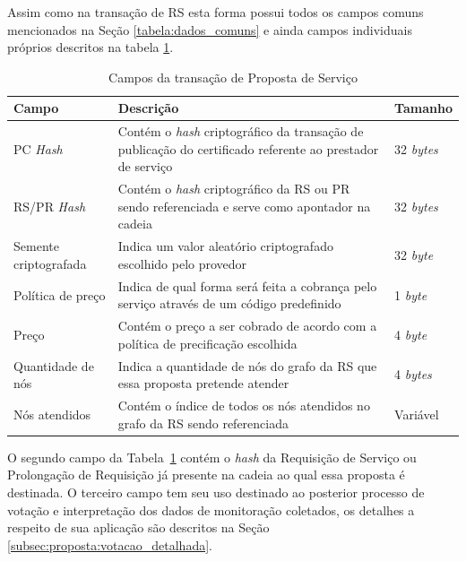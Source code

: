 Assim como na transação de \ac{RS} esta forma possui todos os campos comuns mencionados na Seção \ref{tabela:dados_comuns} e ainda campos individuais próprios descritos na tabela \ref{tabela:ps}.

\begin{table}[ht]
\centering
    \begin{tabular}{|m{}|m{}|m{}|}
    \hline
         \textbf{Campo} & \textbf{Descrição} & \textbf{Tamanho}  \\
         \hline
         \acs{PC} \textit{Hash} & Contém o \textit{hash} criptográfico da transação de publicação do certificado referente ao prestador de serviço & 32 \textit{bytes} \\
         \hline
         \ac{RS}/\acs{PR} \textit{Hash} & Contém o \textit{hash} criptográfico da \ac{RS} ou \acs{PR} sendo referenciada e serve como apontador na cadeia & 32 \textit{bytes} \\
         \hline
         Semente criptografada & Indica um valor aleatório criptografado escolhido pelo provedor & 32 \textit{byte} \\
         \hline
         Política de preço & Indica de qual forma será feita a cobrança pelo serviço através de um código predefinido & 1 \textit{byte} \\
         \hline
         Preço & Contém o preço a ser cobrado de acordo com a política de precificação escolhida & 4 \textit{byte} \\
         \hline
         Quantidade de nós & Indica a quantidade de nós do grafo da \ac{RS} que essa proposta pretende atender & 4 \textit{bytes} \\
         \hline
         Nós atendidos & Contém o índice de todos os nós atendidos no grafo da \ac{RS} sendo referenciada & Variável \\
    \hline
    \end{tabular}
    \caption{Campos da transação de Proposta de Serviço}
    \label{tabela:ps}
\end{table}

O segundo campo da Tabela~\ref{tabela:ps} contém o \textit{hash} da Requisição de Serviço ou Prolongação de Requisição já presente na cadeia ao qual essa proposta é destinada. O terceiro campo tem seu uso destinado ao posterior processo de votação e interpretação dos dados de monitoração coletados, os detalhes a respeito de sua aplicação são descritos na Seção \ref{subsec:proposta:votacao_detalhada}.

